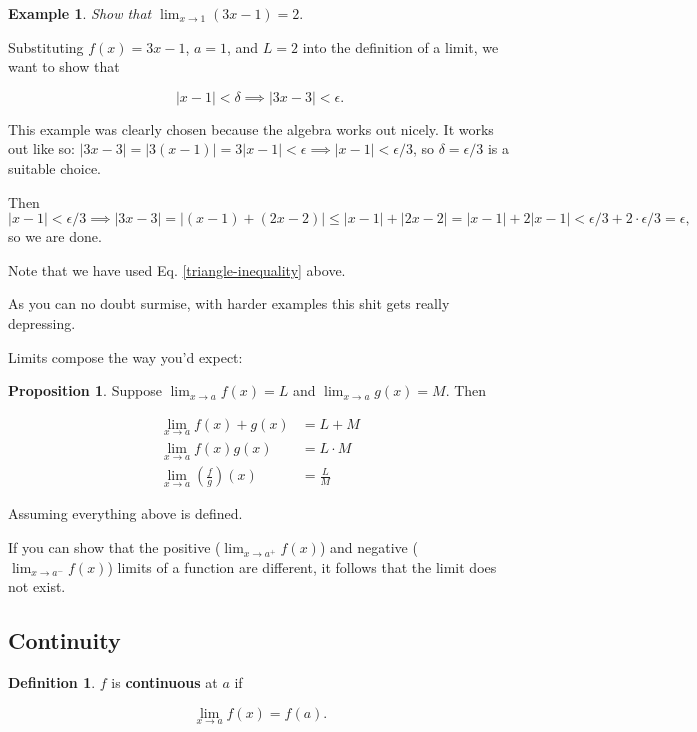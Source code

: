 \documentclass{article}
\theoremstyle{definition}
\newtheorem{definition}{Definition}[section]
\newtheorem{example}{Example}[section]
\newtheorem{proposition}{Proposition}[section]
\begin{document}
\begin{example} 

\emph{Show that $\lim_{x \to 1} (3x-1) = 2$}.

Substituting $f(x) = 3x-1$, $a = 1$, and $L = 2$ into the definition of a limit,
we want to show that

\begin{equation}
|x - 1| < \delta \implies |3x - 3| < \epsilon.
\end{equation}

This example was clearly chosen because the algebra works out nicely. It
works out like so: $|3x-3| = |3(x-1)| = 3|x-1| < \epsilon \implies |x-1| <
\epsilon/3$, so $\delta = \epsilon/3$ is a suitable choice.

Then $|x - 1| < \epsilon/3 \implies |3x-3| = |(x - 1) + (2x-2)| \leq |x-1| +
|2x-2| = |x-1| + 2|x-1| < \epsilon/3 + 2 \cdot \epsilon/3 = \epsilon,$ so we are
done.

Note that we have used Eq. \ref{triangle-inequality} above.
 
\end{example}

As you can no doubt surmise, with harder examples this shit gets really depressing.

Limits compose the way you'd expect:
\begin{proposition}
Suppose $\lim_{x \to a} f(x) = L$ and $\lim_{x \to a} g(x) = M$. Then

\begin{align}
\lim_{x \to a} f(x) + g(x) & = L + M \\
\lim_{x \to a} f(x)g(x) & = L \cdot M \\
\lim_{x \to a} \left(\frac{f}{g}\right)(x) & = \frac{L}{M}
\end{align}

Assuming everything above is defined.

\end{proposition}

If you can show that the positive ($\lim_{x \to a^{+}} f(x)$) and negative
($\lim_{x \to a^{-}} f(x) $) limits of a function are
different, it follows that the limit does not exist.


\subsection{Continuity}

\begin{definition}

$f$ is \textbf{continuous} at $a$ if

\begin{equation}
\lim_{x \to a} f(x) = f(a).
\end{equation}

\end{definition}
\end{document}
